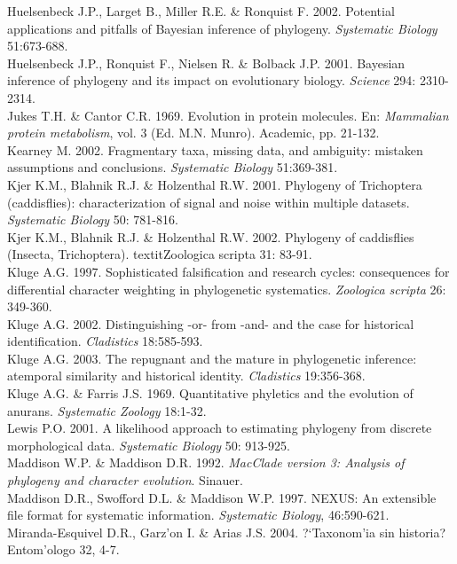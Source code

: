 Huelsenbeck J.P., Larget B., Miller R.E. \& Ronquist F. 2002. Potential applications and pitfalls of Bayesian inference of phylogeny. \textit{Systematic Biology} 51:673-688.\\
Huelsenbeck J.P., Ronquist F., Nielsen R. \& Bolback J.P. 2001. Bayesian inference of phylogeny and its impact on evolutionary biology. \textit{Science} 294: 2310-2314.\\
Jukes T.H. \& Cantor C.R. 1969. Evolution in protein  molecules. En: \textit{Mammalian protein metabolism}, vol. 3 (Ed. M.N. Munro). Academic, pp. 21-132.\\
Kearney M. 2002. Fragmentary taxa, missing data, and ambiguity: mistaken assumptions and conclusions. \textit{Systematic Biology} 51:369-381.\\
Kjer K.M., Blahnik R.J. \& Holzenthal R.W. 2001. Phylogeny of Trichoptera (caddisflies): characterization of signal and noise within multiple datasets. \textit{Systematic Biology} 50: 781-816.\\
Kjer K.M., Blahnik R.J. \& Holzenthal R.W. 2002. Phylogeny of caddisflies (Insecta, Trichoptera). textit{Zoologica scripta} 31: 83-91.\\
Kluge A.G. 1997. Sophisticated falsification and research cycles: consequences for differential character weighting in phylogenetic systematics. \textit {Zoologica scripta} 26: 349-360.\\
Kluge A.G. 2002. Distinguishing -or- from -and- and the case for historical identification. \textit{Cladistics} 18:585-593.\\
Kluge A.G. 2003. The repugnant and the mature in phylogenetic inference: atemporal similarity and historical identity. \textit{Cladistics} 19:356-368.\\ 
Kluge A.G. \& Farris J.S. 1969. Quantitative phyletics and the evolution of anurans. \textit{Systematic Zoology} 18:1-32.\\
Lewis P.O. 2001. A likelihood approach to estimating phylogeny from discrete morphological data. \textit{Systematic Biology} 50: 913-925.\\
Maddison W.P. \& Maddison D.R. 1992. \textit{MacClade version 3: Analysis of phylogeny and character evolution}. Sinauer.\\
Maddison D.R., Swofford D.L. \& Maddison W.P. 1997. NEXUS: An extensible file format for systematic information. \textit{Systematic Biology}, 46:590-621.\\
Miranda-Esquivel D.R., Garz'on I. \& Arias J.S. 2004. ?`Taxonom'ia sin historia? Entom'ologo 32, 4-7.\\

